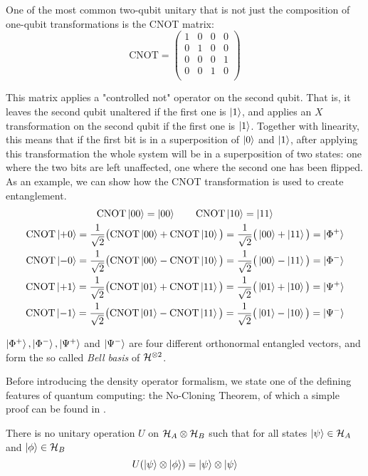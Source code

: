 One of the most common two-qubit unitary that is not just the composition of one-qubit transformations is the CNOT matrix:
\[\text{CNOT} = 
\begin{pmatrix}
1 & 0 & 0 & 0 \\
0 & 1 & 0 & 0 \\
0 & 0 & 0 & 1 \\
0 & 0 & 1 & 0 \\
\end{pmatrix}
\]

This matrix applies a "controlled not" operator on the second qubit. That is, it leaves the second qubit unaltered if the first one is $\ket{1}$, and applies an $X$ transformation on the second qubit if the first one is $\ket{1}$. Together with linearity, this means that if the first bit is in a superposition of $\ket{0}$ and $\ket{1}$, after applying this transformation the whole system will be in a superposition of two states: one where the two bits are left unaffected, one where the second one has been flipped. As an example, we can show how the CNOT transformation is used to create entanglement.
\begin{gather*}
\text{CNOT} \ket{00} = \ket{00} \qquad \text{CNOT} \ket{10} = \ket{11} 
\\
\text{CNOT} \ket{+0} = \frac{1}{\sqrt{2}}\big(\text{CNOT}\ket{00} + \text{CNOT}\ket{10}\big) = \frac{1}{\sqrt{2}}
\big(\ket{00} + \ket{11}\big) = \ket{\Phi^+}
\\
\text{CNOT} \ket{-0} = \frac{1}{\sqrt{2}}\big(\text{CNOT}\ket{00} - \text{CNOT}\ket{10}\big) = \frac{1}{\sqrt{2}}
\big(\ket{00} - \ket{11}\big) = \ket{\Phi^-}
\\
\text{CNOT} \ket{+1} = \frac{1}{\sqrt{2}}\big(\text{CNOT}\ket{01} + \text{CNOT}\ket{11}\big) = \frac{1}{\sqrt{2}}
\big(\ket{01} + \ket{10}\big) = \ket{\Psi^+}
\\
\text{CNOT} \ket{-1} = \frac{1}{\sqrt{2}}\big(\text{CNOT}\ket{01} - \text{CNOT}\ket{11}\big) = \frac{1}{\sqrt{2}}
\big(\ket{01} - \ket{10}\big) = \ket{\Psi^-}
\end{gather*}

$\ket{\Phi^+}, \ket{\Phi^-}, \ket{\Psi^+}$ and 
$\ket{\Psi^-}$ are four different orthonormal entangled vectors, and form the so called \textit{Bell basis} of $\mathcal{H}^{\otimes 2}$.

Before introducing the density operator formalism, we state one of the defining features of quantum computing: the No-Cloning Theorem, of which a simple proof can be found in \cite{nielsenQuantumComputationQuantum2010}.

\begin{theorem}\label{noCloning}
There is no unitary operation $U$ on $\mathcal{H}_A \otimes \mathcal{H}_B$ such that for all states $\ket{\psi} \in \mathcal{H}_A$ and $\ket{\phi} \in \mathcal{H}_B$
\[U(\ket{\psi} \otimes \ket{\phi}) = \ket{\psi} \otimes \ket{\psi}
\]
\end{theorem}

